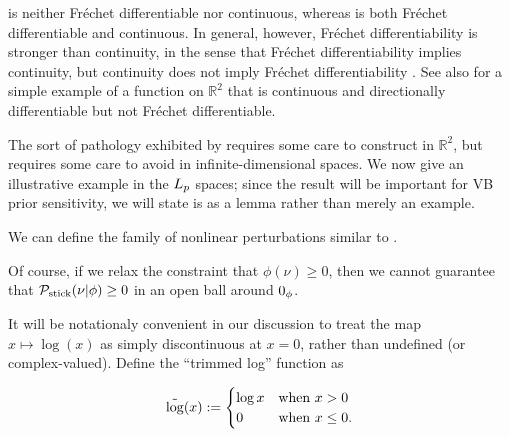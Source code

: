  is neither Fr{\'e}chet differentiable nor continuous,
whereas  is both Fr{\'e}chet differentiable and
continuous.  In general, however, Fr{\'e}chet differentiability is stronger than
continuity, in the sense that Fr{\'e}chet differentiability implies continuity,
but continuity does not imply Fr{\'e}chet differentiability \citep[Proposition
4.8 (d)]{zeidler:2013:functional}.  See also \citet[Example
1.9]{averbukh:1967:theory} for a simple example of a function on $\mathbb{R}^2$
that is continuous and directionally differentiable but not Fr{\'e}chet
differentiable.

The sort of pathology exhibited by 
requires some care to construct in $\mathbb{R}^2$, but requires some care to
avoid in infinite-dimensional spaces.  We now give an illustrative example in
the ${L_{p}}$ spaces; since the result will be important for VB prior
sensitivity, we will state is as a lemma rather than merely an example.

We can define the family of nonlinear perturbations similar to
\citep{gustafson:1996:local}.




Of course, if we relax the constraint that $\phi(\nu) \ge 0$, then we cannot
guarantee that $\mathcal{P}_{\mathrm{stick}}(\nu \vert \phi) \ge 0$ in an open ball around $0_\phi$.


It will be notationaly convenient in our discussion to treat the map $x \mapsto
\log(x)$ as simply discontinuous at $x = 0$, rather than undefined (or
complex-valued). Define the ``trimmed log'' function as

\begin{defn}
%
\begin{align*}
%
\logtrim(x) :=
\begin{cases}
    \log x  &\textrm{when }x > 0 \\
    0       &\textrm{when }x \le 0.
\end{cases}
%
\end{align*}
%
%
%
\end{defn}

